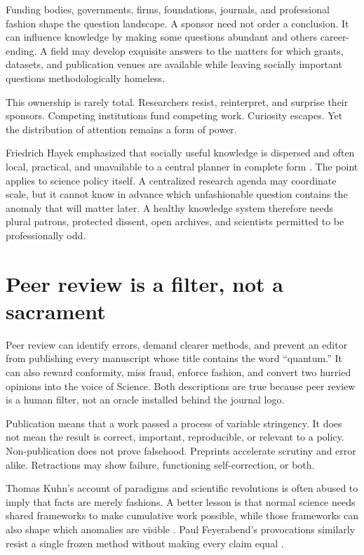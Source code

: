 \documentclass[12pt,a4paper]{book}
\begin{document}
Funding bodies, governments, firms, foundations, journals, and professional
fashion shape the question landscape.  A sponsor need not order a conclusion.
It can influence knowledge by making some questions abundant and others
career-ending.  A field may develop exquisite answers to the matters for which
grants, datasets, and publication venues are available while leaving socially
important questions methodologically homeless.

This ownership is rarely total.  Researchers resist, reinterpret, and surprise
their sponsors.  Competing institutions fund competing work.  Curiosity
escapes.  Yet the distribution of attention remains a form of power.

Friedrich Hayek emphasized that socially useful knowledge is dispersed and
often local, practical, and unavailable to a central planner in complete form
\cite{Hayek-45}.  The point applies to science policy itself.  A centralized
research agenda may coordinate scale, but it cannot know in advance which
unfashionable question contains the anomaly that will matter later.  A healthy
knowledge system therefore needs plural patrons, protected dissent, open
archives, and scientists permitted to be professionally odd.

\section{Peer review is a filter, not a sacrament}

Peer review can identify errors, demand clearer methods, and prevent an editor
from publishing every manuscript whose title contains the word ``quantum.''
It can also reward conformity, miss fraud, enforce fashion, and convert two
hurried opinions into the voice of Science.  Both descriptions are true
because peer review is a human filter, not an oracle installed behind the
journal logo.

Publication means that a work passed a process of variable stringency.  It
does not mean the result is correct, important, reproducible, or relevant to a
policy.  Non-publication does not prove falsehood.  Preprints accelerate
scrutiny and error alike.  Retractions may show failure, functioning
self-correction, or both.

Thomas Kuhn's account of paradigms and scientific revolutions is often abused
to imply that facts are merely fashions.  A better lesson is that normal
science needs shared frameworks to make cumulative work possible, while those
frameworks can also shape which anomalies are visible
\cite{kuhn}.  Paul Feyerabend's provocations similarly resist a single frozen
method without making every claim equal \cite{Feyerabend2001May,feyerabend-defense}.
\end{document}
